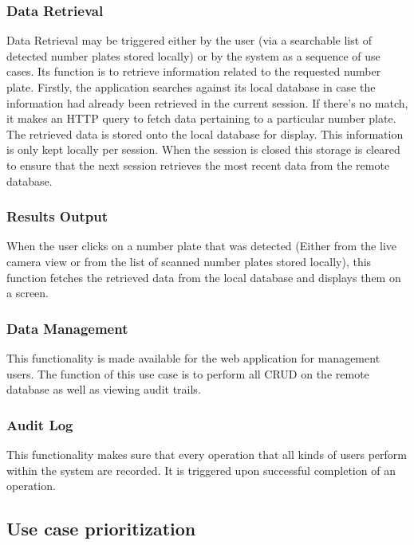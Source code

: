 \documentclass[12pt]{article}
\begin{document}
                    		\subsubsection{Data Retrieval}
                    				Data Retrieval may be triggered either by the user (via a searchable list of detected number plates stored locally) or by the system as a sequence of use cases. Its function is to retrieve information related to the requested number plate. Firstly, the application searches against its local database in case the information had already been retrieved in the current session. If there's no match, it makes an HTTP query to fetch data pertaining to a particular number plate. The retrieved data is stored onto the local database for display. This information is only kept locally per session. When the session is closed this storage is cleared to ensure that the next session retrieves the most recent data from the remote database.
                    		
                    		\subsubsection{Results Output}
                    				When the user clicks on a number plate that was detected (Either from the live camera view or from the list of scanned number plates stored locally), this function fetches the retrieved data from the local database  and displays them on a screen.
                    				
                    				
                    		\subsubsection{Data Management}
                    				This functionality is made available for the web application for management users. The function of this use case is to perform all CRUD on the remote database as well as viewing audit trails.
                    				
                    		\subsubsection{Audit Log}
                    				This functionality makes sure that every operation that all kinds of users perform within the system are recorded. It is triggered upon successful completion of an operation.
                    				
                    \subsection{Use case prioritization}
\end{document}

